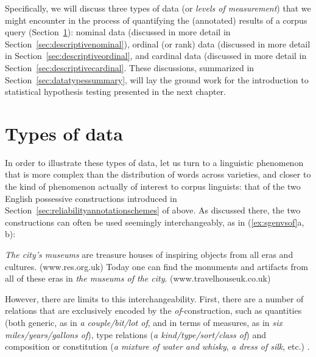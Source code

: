 Specifically, we will discuss three types of data (or \textit{levels of measurement})  that we might encounter in the process of quantifying  the (annotated)  results of a corpus query  (Section~\ref{sec:typesofdata}): nominal  data (discussed in more detail in Section~\ref{sec:descriptivenominal}), ordinal  (or rank) data (discussed in more detail in Section~\ref{sec:descriptiveordinal}, and cardinal  data (discussed in more detail in Section~\ref{sec:descriptivecardinal}. These discussions, summarized in Section~\ref{sec:datatypessummary}, will lay the ground work for the introduction to statistical hypothesis  testing presented in the next chapter.

\section{Types of data}
\label{sec:typesofdata}

In order to illustrate these types of data, let us turn to a linguistic phenomenon that is more complex  than the distribution  of words across varieties,  and closer to the kind of phenomenon actually of interest to corpus linguists: that of the two English possessive  constructions introduced in Section~\ref{sec:reliabilityannotationschemes} of  above. As discussed there, the two constructions can often be used seemingly interchangeably, as in (\ref{ex:sgenvsof}a, b):

\begin{exe}
\ex
\begin{xlist}
\label{ex:sgenvsof}
\ex \textit{The city's museums} are treasure houses of inspiring objects from all eras and cultures. (www.res.org.uk)
\ex Today one can find the monuments and artifacts from all of these eras in \textit{the museums of the city}. (www.travelhouseuk.co.uk)
\end{xlist}
\end{exe}

However, there are limits to this interchangeability. First, there are a number of relations that are exclusively encoded by the \textit{of}-construction, such as quantities (both generic, as in \textit{a couple\slash bit\slash lot of}, and in terms of measures, as in \textit{six miles\slash years\slash gallons of}), type relations (\textit{a kind\slash type\slash sort\slash class of}) and composition or constitution (\textit{a mixture of water and whisky}, \textit{a dress of silk}, etc.) \citep[cf., e.g.,][]{rohdenburg_constructional_2003}.

